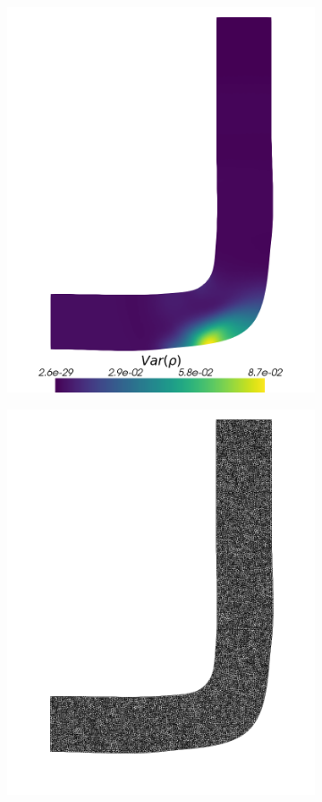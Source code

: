 \begin{figure}[H]
\begin{subfigure}{0.3\linewidth}
		\includegraphics[scale=0.2]{figs/pipe/pipe_sc_ref_n50_Var(rho).png}
		\label{fig:referenceSolutionsPipe2}
	\end{subfigure}
	\hfill
	\begin{subfigure}{0.3\linewidth}
		\centering
		\includegraphics[scale=0.2]{figs/pipe/pipe_mesh.png}

\end{subfigure}
\end{figure}
